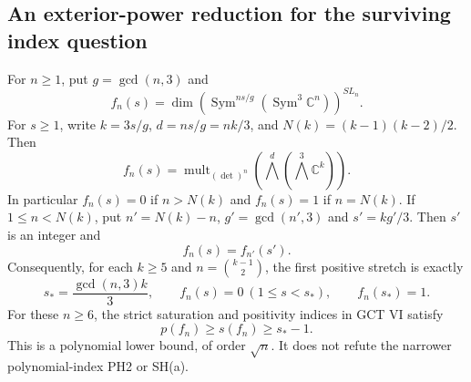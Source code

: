 \subsection{An exterior-power reduction for the surviving index question}

\begin{proposition}
\label{prop:cubicexteriorduality}
For $n\ge1$, put $g=\gcd(n,3)$ and
\[
 f_n(s)=\dim\left(\operatorname{Sym}^{ns/g}
                         (\operatorname{Sym}^3\mathbb C^n)\right)^{SL_n}.
\]
For $s\ge1$, write $k=3s/g$, $d=ns/g=nk/3$, and
$N(k)=(k-1)(k-2)/2$. Then
\[
 f_n(s)=\operatorname{mult}_{(\det)^n}
       \left(\bigwedge^d\left(\bigwedge^3\mathbb C^k\right)\right).
 \tag{P-F32a}
\]
In particular $f_n(s)=0$ if $n>N(k)$ and $f_n(s)=1$ if $n=N(k)$.
If $1\le n<N(k)$, put $n'=N(k)-n$, $g'=\gcd(n',3)$
and $s'=kg'/3$. Then $s'$ is an integer and
\[
                         f_n(s)=f_{n'}(s').
 \tag{P-F32b}
\]
Consequently, for each $k\ge5$ and $n=\binom{k-1}{2}$,
the first positive stretch is exactly
\[
 s_* = \frac{\gcd(n,3)k}{3},\qquad
 f_n(s)=0\ (1\le s<s_*),\qquad f_n(s_*)=1.
 \tag{P-F32c}
\]
For these $n\ge6$, the strict saturation and positivity
indices in GCT VI satisfy
\[
                     p(f_n)\ge s(f_n)\ge s_*-1.
 \tag{P-F32d}
\]
This is a polynomial lower bound, of order $\sqrt n$.
It does not refute the narrower polynomial-index PH2 or SH(a).
\end{proposition}

